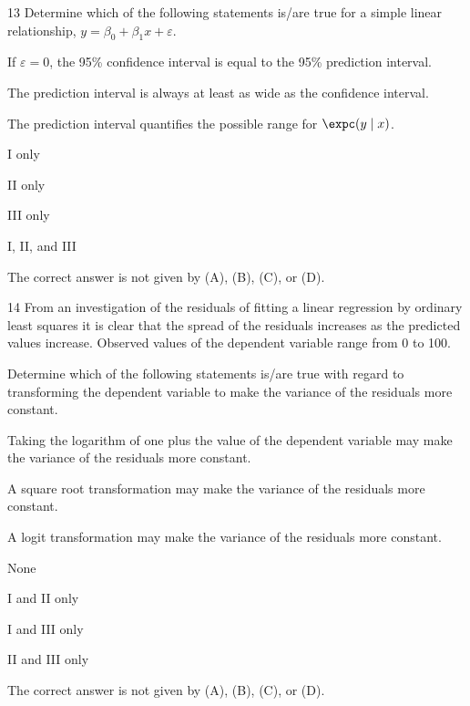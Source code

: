 \begin{question}{13}
Determine which of the following statements is/are true for a simple linear relationship, $y = \beta_0 + \beta_1 x + \varepsilon$.
\begin{statements}
\item If $\varepsilon = 0$, the 95\% confidence interval is equal to the 95\% prediction interval.
\item The prediction interval is always at least as wide as the confidence interval.
\item The prediction interval quantifies the possible range for $\expc(y \mid x)$.
\end{statements}

\begin{choices}
\item I only
\item II only
\item III only
\item I, II, and III
\item The correct answer is not given by (A), (B), (C), or (D).
\end{choices}
\end{question}
\begin{question}{14}
From an investigation of the residuals of fitting a linear regression by ordinary least squares it is clear that the spread of the residuals increases as the predicted values increase. Observed values of the dependent variable range from 0 to 100.

Determine which of the following statements is/are true with regard to transforming the dependent variable to make the variance of the residuals more constant.
\begin{statements}
\item Taking the logarithm of one plus the value of the dependent variable may make the variance of the residuals more constant.
\item A square root transformation may make the variance of the residuals more constant.
\item A logit transformation may make the variance of the residuals more constant.
\end{statements}

\begin{choices}
\item None
\item I and II only
\item I and III only
\item II and III only
\item The correct answer is not given by (A), (B), (C), or (D).
\end{choices}
\end{question}


